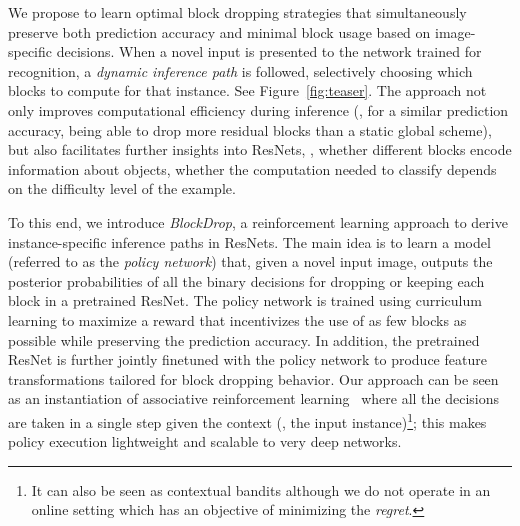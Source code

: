 \documentclass[10pt,twocolumn,letterpaper]{article}
\newcommand{\system}{BlockDrop\xspace}
\begin{document}
We propose to learn optimal block dropping strategies that simultaneously preserve both prediction accuracy and minimal block usage based on image-specific decisions. 
When a novel input is presented to the network trained for recognition, a \emph{dynamic inference path} is followed, selectively choosing which blocks to compute for that instance.  See Figure~\ref{fig:teaser}.  The approach not only improves computational efficiency during inference (\ie, for a similar prediction accuracy, being able to drop more residual blocks than a static global scheme), but also facilitates further insights into ResNets, \eg, whether different blocks encode information about objects, whether the computation needed to classify depends on the difficulty level of the example.  

To this end, we introduce \emph{\system}, a reinforcement learning approach to derive instance-specific inference paths in ResNets.  The main idea is to learn a model (referred to as the \emph{policy network}) that, given a novel input image, outputs the posterior probabilities of all the binary decisions for dropping or keeping each block in a pretrained ResNet. The policy network is trained using curriculum learning to maximize a reward that incentivizes the use of as few blocks as possible while preserving the prediction accuracy. In addition, the pretrained ResNet is further jointly finetuned with the policy network to produce feature transformations tailored for block dropping behavior.  Our approach can be seen as an instantiation of associative reinforcement learning~\cite{sutton1998reinforcement} where all the decisions are taken in a single step given the context (\ie, the input instance)\footnote{It can also be seen as contextual bandits \cite{langford2008epoch} although we do not operate in an online setting which has an objective of minimizing the \emph{regret}.}; this makes policy execution lightweight and scalable to very deep networks.  
\end{document}
